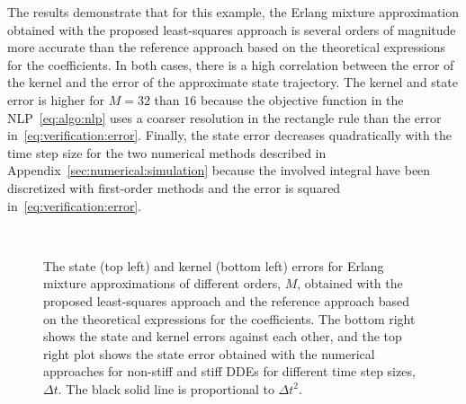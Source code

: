 The results demonstrate that for this example, the Erlang mixture approximation obtained with the proposed least-squares approach is several orders of magnitude more accurate than the reference approach based on the theoretical expressions for the coefficients. In both cases, there is a high correlation between the error of the kernel and the error of the approximate state trajectory. The kernel and state error is higher for $M = 32$ than $16$ because the objective function in the NLP~\eqref{eq:algo:nlp} uses a coarser resolution in the rectangle rule than the error in~\eqref{eq:verification:error}. Finally, the state error decreases quadratically with the time step size for the two numerical methods described in Appendix~\ref{sec:numerical:simulation} because the involved integral have been discretized with first-order methods and the error is squared in~\eqref{eq:verification:error}.
%
\begin{figure*}
	 \\
	\caption{The state (top left) and kernel (bottom left) errors for Erlang mixture approximations of different orders, $M$, obtained with the proposed least-squares approach and the reference approach based on the theoretical expressions for the coefficients. The bottom right shows the state and kernel errors against each other, and the top right plot shows the state error obtained with the numerical approaches for non-stiff and stiff DDEs for different time step sizes, $\Delta t$. The black solid line is proportional to $\Delta t^2$.}
	\label{fig:verification}
\end{figure*}
